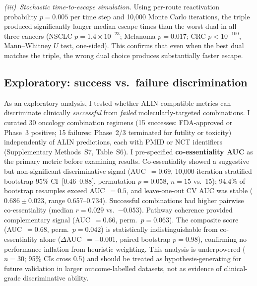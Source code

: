 \documentclass[11pt]{article}
\begin{document}
\emph{(iii)~Stochastic time-to-escape simulation.} Using per-route
reactivation probability $p=0.005$ per time step and 10{,}000 Monte
Carlo iterations, the triple produced significantly longer median
escape times than the worst dual in all three cancers (NSCLC
$p=1.4\times10^{-23}$; Melanoma $p=0.017$; CRC $p<10^{-100}$,
Mann--Whitney $U$ test, one-sided). This confirms that even when the
best dual matches the triple, the wrong dual choice produces
substantially faster escape.

\subsection{Exploratory: success vs.\ failure discrimination}
\label{sec:exploratory_auc}
As an exploratory analysis, I tested whether ALIN-compatible metrics can discriminate clinically \emph{successful} from \emph{failed} molecularly-targeted combinations.
I curated 30 oncology combination regimens (15 successes: FDA-approved or Phase~3 positive; 15 failures: Phase~2/3 terminated for futility or toxicity) independently of ALIN predictions, each with PMID or NCT identifiers (Supplementary Methods~S7, Table~S6). I pre-specified \textbf{co-essentiality AUC} as the primary metric before examining results.
Co-essentiality showed a suggestive but non-significant discriminative signal (AUC~$= 0.69$, 10{,}000-iteration stratified bootstrap 95\% CI~$[0.46$--$0.88]$, permutation $p = 0.058$, $n = 15$ vs.\ 15); 94.4\% of bootstrap resamples exceed AUC~$= 0.5$, and leave-one-out CV AUC was stable ($0.686 \pm 0.023$, range 0.657--0.734). Successful combinations had higher pairwise co-essentiality (median $r = 0.029$ vs.\ $-0.053$).
Pathway coherence provided complementary signal (AUC~$= 0.66$, perm.~$p = 0.063$). The composite score (AUC~$= 0.68$, perm.~$p = 0.042$) is statistically indistinguishable from co-essentiality alone ($\Delta$AUC~$= -0.001$, paired bootstrap $p = 0.98$), confirming no performance inflation from heuristic weighting.
This analysis is underpowered ($n = 30$; 95\% CIs cross 0.5) and should be treated as hypothesis-generating for future validation in larger outcome-labelled datasets, not as evidence of clinical-grade discriminative ability.
\end{document}

